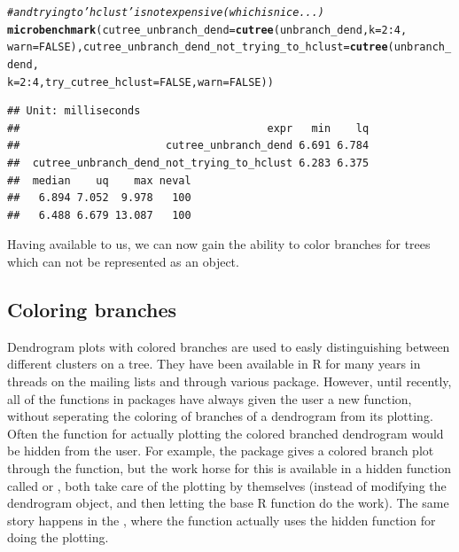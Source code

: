 \documentclass[shortnames,nojss,article]{jss}\usepackage[]{graphicx}\usepackage[]{color}
\makeatletter
\newcommand{\hlnum}[1]{\textcolor[rgb]{0.686,0.059,0.569}{#1}}%
\newcommand{\hlcom}[1]{\textcolor[rgb]{0.678,0.584,0.686}{\textit{#1}}}%
\newcommand{\hlopt}[1]{\textcolor[rgb]{0,0,0}{#1}}%
\newcommand{\hlstd}[1]{\textcolor[rgb]{0.345,0.345,0.345}{#1}}%
\newcommand{\hlkwc}[1]{\textcolor[rgb]{0.333,0.667,0.333}{#1}}%
\newcommand{\hlkwd}[1]{\textcolor[rgb]{0.737,0.353,0.396}{\textbf{#1}}}%
\newenvironment{kframe}{%
 \def\at@end@of@kframe{}%
 \ifinner\ifhmode%
  \def\at@end@of@kframe{\end{minipage}}%
  \begin{minipage}{\columnwidth}%
 \fi\fi%
 \def\FrameCommand##1{\hskip\@totalleftmargin \hskip-\fboxsep
 \colorbox{shadecolor}{##1}\hskip-\fboxsep
     \hskip-\linewidth \hskip-\@totalleftmargin \hskip\columnwidth}%
 \MakeFramed {\advance\hsize-\width
   \@totalleftmargin\z@ \linewidth\hsize
   \@setminipage}}%
 {\par\unskip\endMakeFramed%
 \at@end@of@kframe}
\newenvironment{knitrout}{}{} %
\makeatother
\begin{document}
\begin{knitrout}
\begin{kframe}
\begin{alltt}
\hlcom{# and trying to 'hclust' is not expensive (which is nice...)}
\hlkwd{microbenchmark}\hlstd{(}\hlkwc{cutree_unbranch_dend} \hlstd{=} \hlkwd{cutree}\hlstd{(unbranch_dend,} \hlkwc{k} \hlstd{=} \hlnum{2}\hlopt{:}\hlnum{4}\hlstd{,}
    \hlkwc{warn} \hlstd{=} \hlnum{FALSE}\hlstd{),} \hlkwc{cutree_unbranch_dend_not_trying_to_hclust} \hlstd{=} \hlkwd{cutree}\hlstd{(unbranch_dend,}
    \hlkwc{k} \hlstd{=} \hlnum{2}\hlopt{:}\hlnum{4}\hlstd{,} \hlkwc{try_cutree_hclust} \hlstd{=} \hlnum{FALSE}\hlstd{,} \hlkwc{warn} \hlstd{=} \hlnum{FALSE}\hlstd{))}
\end{alltt}
\begin{verbatim}
## Unit: milliseconds
##                                       expr   min    lq
##                       cutree_unbranch_dend 6.691 6.784
##  cutree_unbranch_dend_not_trying_to_hclust 6.283 6.375
##  median    uq    max neval
##   6.894 7.052  9.978   100
##   6.488 6.679 13.087   100
\end{verbatim}
\begin{alltt}

\end{alltt}
\end{kframe}
\end{knitrout}



Having  available to us, we can now gain the ability to color branches for trees which can not be represented as an  object.

\subsection{Coloring branches}


Dendrogram plots with colored branches are used to easly distinguishing between different clusters on a tree. They have been available in R for many years in threads on the mailing lists and through various package. However, until recently, all of the functions in packages have always given the user a new  function, without seperating the coloring of branches of a dendrogram from its plotting. Often the function for actually plotting the colored branched dendrogram would be hidden from the user. For example, the  package \citep{CRAN:labeltodendro} gives a colored branch plot through the  function, but the work horse for this is available in a hidden function called  or , both take care of the plotting by themselves (instead of modifying the dendrogram object, and then letting the base R function do the work). The same story happens in the  \citep{CRAN:Heatplus}, where the  function actually uses the hidden function  for doing the plotting.
\end{document}
